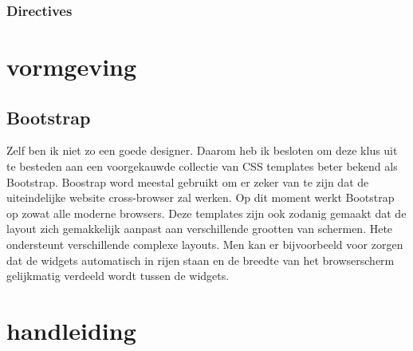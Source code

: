 \documentclass[a4paper,11pt]{article}
\begin{document}
\subsubsection{Directives}

\section{vormgeving}

\subsection{Bootstrap}
Zelf ben ik niet zo een goede designer. Daarom heb ik besloten om deze klus uit te besteden aan een voorgekauwde collectie van CSS templates beter bekend als Bootstrap. Boostrap word meestal gebruikt om er zeker van te zijn dat de uiteindelijke website cross-browser zal werken. Op dit moment werkt Bootstrap op zowat alle moderne browsers. Deze templates zijn ook zodanig gemaakt dat de layout zich gemakkelijk aanpast aan verschillende grootten van schermen. Hete ondersteunt verschillende complexe layouts. Men kan er bijvoorbeeld voor zorgen dat de widgets automatisch in rijen staan en de breedte van het browserscherm gelijkmatig verdeeld wordt tussen de widgets.

\section{handleiding}
\end{document}
